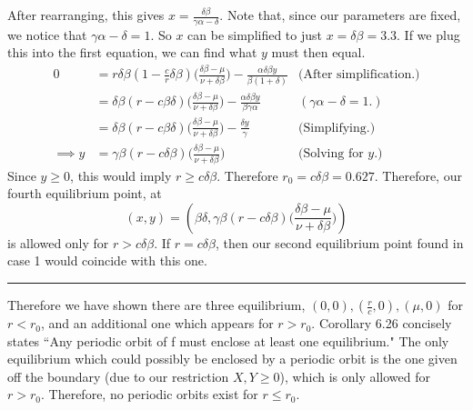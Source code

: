 \begin{solution}
\begin{enumerate}
        After rearranging, this gives $x = \frac{\delta \beta}{\gamma\alpha - \delta}$. Note that, since our parameters are fixed, we notice that $\gamma\alpha - \delta = 1$. So $x$ can be simplified to just $x = \delta \beta = 3.3$. If we plug this into the first equation, we can find what $y$ must then equal.
        \tightalignbreak
        \begin{align*}
            0&= r\delta\beta(1 - \frac{c}{r}\delta\beta)\bigg(\frac{\delta \beta - \mu}{\nu + \delta\beta}\bigg) - \frac{\alpha\delta\beta y}{\beta(1 + \delta)} &\text{(After simplification.)}\\
            &= \delta\beta(r - c\beta\delta)\bigg(\frac{\delta \beta - \mu}{\nu + \delta\beta}\bigg) - \frac{\alpha\delta\beta y}{\beta\gamma\alpha} &(\gamma\alpha - \delta = 1.)\\
            &= \delta\beta(r - c\beta\delta)\bigg(\frac{\delta \beta - \mu}{\nu + \delta\beta}\bigg) - \frac{\delta y}{\gamma} &\text{(Simplifying.)}\\
            \implies y &= \gamma\beta(r - c\delta\beta)\bigg(\frac{\delta \beta - \mu}{\nu + \delta\beta}\bigg) &\text{(Solving for $y$.)}
        \end{align*}
        \alignbreak
        Since $y \geq 0$, this would imply $r \geq c\delta \beta$. Therefore $r_0 = c\delta \beta = 0.627$. Therefore, our fourth equilibrium point, at
        \[
        (x, y) = (\beta\delta, \gamma\beta(r - c\delta\beta)\bigg(\frac{\delta \beta - \mu}{\nu + \delta\beta}\bigg))
        \]
        is allowed only for $r > c\delta \beta$. If $r = c\delta\beta$, then our second equilibrium point found in case 1 would coincide with this one. 
    \end{enumerate}
    \hrule

    \jump
    Therefore we have shown there are three equilibrium, $(0, 0), (\frac{r}{c}, 0), (\mu, 0)$ for $r < r_0$, and an additional one which appears for $r > r_0$. Corollary 6.26 concisely states ``Any periodic orbit of f must enclose at least one equilibrium." The only equilibrium which could possibly be enclosed by a periodic orbit is the one given off the boundary (due to our restriction $X, Y \geq 0$), which is only allowed for $r > r_0$. Therefore, no periodic orbits exist for $r \leq r_0$.
\end{solution}

\newpage
